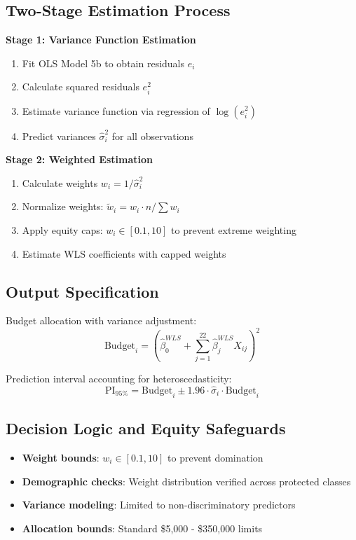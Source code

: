 \subsection{Two-Stage Estimation Process}

\textbf{Stage 1: Variance Function Estimation}
\begin{enumerate}
    \item Fit OLS Model 5b to obtain residuals $e_i$
    \item Calculate squared residuals $e_i^2$
    \item Estimate variance function via regression of $\log(e_i^2)$
    \item Predict variances $\hat{\sigma}_i^2$ for all observations
\end{enumerate}

\textbf{Stage 2: Weighted Estimation}
\begin{enumerate}
    \item Calculate weights $w_i = 1/\hat{\sigma}_i^2$
    \item Normalize weights: $\tilde{w}_i = w_i \cdot n / \sum w_i$
    \item Apply equity caps: $w_i \in [0.1, 10]$ to prevent extreme weighting
    \item Estimate WLS coefficients with capped weights
\end{enumerate}

\subsection{Output Specification}

Budget allocation with variance adjustment:
\begin{equation}
\text{Budget}_i = \left(\hat{\beta}_0^{WLS} + \sum_{j=1}^{22} \hat{\beta}_j^{WLS} X_{ij}\right)^2
\end{equation}

Prediction interval accounting for heteroscedasticity:
\begin{equation}
\text{PI}_{95\%} = \text{Budget}_i \pm 1.96 \cdot \hat{\sigma}_i \cdot \text{Budget}_i
\end{equation}

\subsection{Decision Logic and Equity Safeguards}

\begin{itemize}
    \item \textbf{Weight bounds}: $w_i \in [0.1, 10]$ to prevent domination
    \item \textbf{Demographic checks}: Weight distribution verified across protected classes
    \item \textbf{Variance modeling}: Limited to non-discriminatory predictors
    \item \textbf{Allocation bounds}: Standard \$5,000 - \$350,000 limits
\end{itemize}

